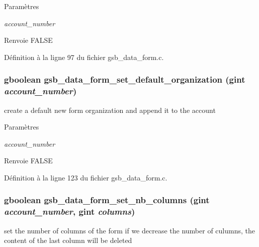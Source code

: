 \begin{DoxyParams}{Paramètres}
\item[{\em account\_\-number}]\end{DoxyParams}
\begin{DoxyReturn}{Renvoie}
FALSE 
\end{DoxyReturn}


Définition à la ligne 97 du fichier gsb\_\-data\_\-form.c.

\subsubsection[{gsb\_\-data\_\-form\_\-set\_\-default\_\-organization}]{\setlength{\rightskip}{0pt plus 5cm}gboolean gsb\_\-data\_\-form\_\-set\_\-default\_\-organization (gint {\em account\_\-number})}\label{gsb__data__form_8h_a4f0c2bea1f39f695cccdee80bb8fe2ee}
create a default new form organization and append it to the account


\begin{DoxyParams}{Paramètres}
\item[{\em account\_\-number}]\end{DoxyParams}
\begin{DoxyReturn}{Renvoie}
FALSE 
\end{DoxyReturn}


Définition à la ligne 123 du fichier gsb\_\-data\_\-form.c.

\subsubsection[{gsb\_\-data\_\-form\_\-set\_\-nb\_\-columns}]{\setlength{\rightskip}{0pt plus 5cm}gboolean gsb\_\-data\_\-form\_\-set\_\-nb\_\-columns (gint {\em account\_\-number}, \/  gint {\em columns})}\label{gsb__data__form_8h_a9b4608cf8f2ffba4904a2fdd6263e8b6}
set the number of columns of the form if we decrease the number of culumns, the content of the last column will be deleted


